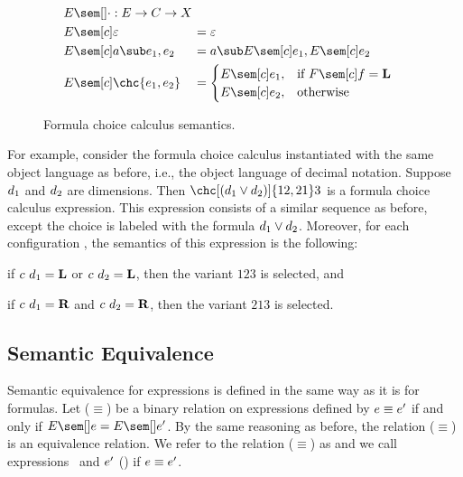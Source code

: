 \begin{figure}[H]
  \onehalfspacing
  \begin{alignat*}{2}
    &\mathrlap{\ccSem{\cdot} : \ccS \to \cS \to \objS} \\
    &\ccSem[\cE]{\objEmpty} &&= \objEmpty \\
    &\ccSem[\cE]{\tr{\ccE_1, \ccE_2}} &&=
    \tr{\ccSem[\cE]{\ccE_1}, \ccSem[\cE]{\ccE_2}} \\
    &\ccSem[\cE]{\chc{\ccE_1, \ccE_2}} &&=
    \begin{cases}
      \ccSem[\cE]{\ccE_1}, & \text{if }\fSem[\cE]{\fE} = \tagL \\
      \ccSem[\cE]{\ccE_2}, & \text{otherwise}%
    \end{cases}
  \end{alignat*}
  \caption{Formula choice calculus semantics.}
  \label{fig:fccsem}
\end{figure}

For example, consider the formula choice calculus instantiated with the same object language as before, i.e., the object language of decimal notation.
Suppose $\color{black}d_1$ and $\color{black}d_2$ are dimensions.
Then $\chc[(\dE_1 \lor \dE_2)]{12,21}3$ is a formula choice calculus expression.
This expression consists of a similar sequence as before, except the choice is labeled with the formula $\color{black}d_1 \lor \color{black}d_2$.
Moreover, for each configuration \cE, the semantics of this expression is the following:
%
\begin{inparaenum}[(1)]
  \item if $\color{black}c\ \color{black}d_1 = \color{black}\mathbf{L}$ or $\color{black}c\ \color{black}d_2 = \color{black}\mathbf{L}$, then the variant $123$ is selected, and
  \item if $\color{black}c\ \color{black}d_1 = \color{black}\mathbf{R}$ and $\color{black}c\ \color{black}d_2 = \color{black}\mathbf{R}$, then the variant $213$ is selected.
\end{inparaenum}

\subsection{Semantic Equivalence}
\label{sec:fcceq}

Semantic equivalence for expressions is defined in the same way as it is for formulas.
Let ($\equiv$) be a binary relation on expressions defined by $\color{black}e \equiv \color{black}e'$ if and only if $\ccSem{\ccE} = \ccSem{\ccE'}$.
By the same reasoning as before, the relation ($\equiv$) is an equivalence relation.
We refer to the relation ($\equiv$) as  and we call expressions \ccE\ and $\color{black}e'$ ()  if $\color{black}e \equiv \color{black}e'$.

